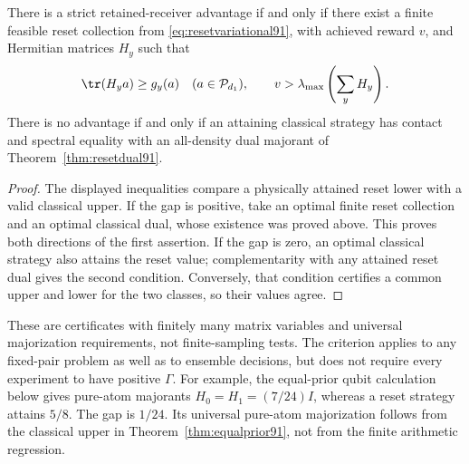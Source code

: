 \begin{corollary}\label{cor:gapcertificate91}
There is a strict retained-receiver advantage if and only if there exist
a finite feasible reset collection from \eqref{eq:resetvariational91},
with achieved reward $v$, and Hermitian matrices $H_y$ such that
\[
 \tr(H_ya)\ge g_y(a)\quad(a\in\mathcal P_{d_1}),\qquad
 v>\lambda_{\max}\left(\sum_yH_y\right).
\]
There is no advantage if and only if an attaining classical strategy
has contact and spectral equality with an all-density dual majorant
of Theorem~\ref{thm:resetdual91}.
\end{corollary}
\begin{proof}
The displayed inequalities compare a physically attained reset lower
with a valid classical upper.  If the gap is positive, take an optimal
finite reset collection and an optimal classical dual, whose existence
was proved above.  This proves both directions of the first assertion.
If the gap is zero, an optimal classical strategy also attains the reset
value; complementarity with any attained reset dual gives the second
condition.  Conversely, that condition certifies a common upper and
lower for the two classes, so their values agree.
\end{proof}
These are certificates with finitely many matrix variables and universal
majorization requirements, not finite-sampling tests.  The criterion
applies to any fixed-pair problem as well as to ensemble decisions,
but does not require every experiment to have positive $\Gamma$.
For example, the equal-prior qubit calculation below gives pure-atom
majorants $H_0=H_1=(7/24)I$, whereas a reset strategy attains $5/8$.
The gap is $1/24$.  Its universal pure-atom majorization follows from
the classical upper in Theorem~\ref{thm:equalprior91}, not from the
finite arithmetic regression.

